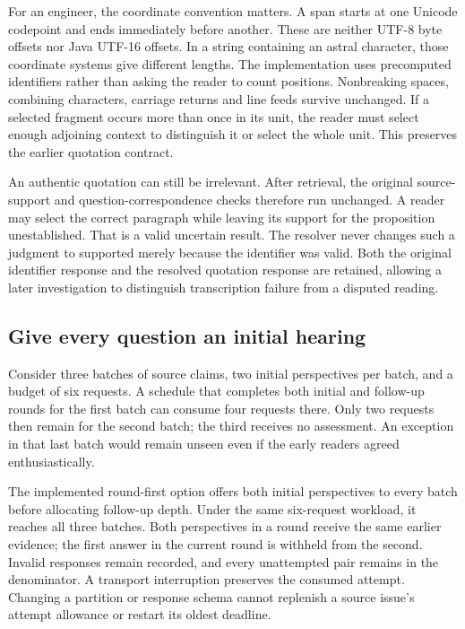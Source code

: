 \documentclass[12pt,a4paper,oneside,openany]{book}
\begin{document}
For an engineer, the coordinate convention matters. A span starts at one
Unicode codepoint and ends immediately before another. These are neither UTF-8
byte offsets nor Java UTF-16 offsets. In a string containing an astral character,
those coordinate systems give different lengths. The implementation uses
precomputed identifiers rather than asking the reader to count positions.
Nonbreaking spaces, combining characters, carriage returns and line feeds
survive unchanged. If a selected fragment occurs more than once in its unit,
the reader must select enough adjoining context to distinguish it or select the
whole unit. This preserves the earlier quotation contract.

An authentic quotation can still be irrelevant. After retrieval, the original
source-support and question-correspondence checks therefore run unchanged. A
reader may select the correct paragraph while leaving its support for the
proposition unestablished. That is a valid uncertain result. The resolver never
changes such a judgment to supported merely because the identifier was valid.
Both the original identifier response and the resolved quotation response are
retained, allowing a later investigation to distinguish transcription failure
from a disputed reading.

\subsection{Give every question an initial hearing}

Consider three batches of source claims, two initial perspectives per batch,
and a budget of six requests. A schedule that completes both initial and
follow-up rounds for the first batch can consume four requests there. Only two
requests then remain for the second batch; the third receives no assessment.
An exception in that last batch would remain unseen even if the early readers
agreed enthusiastically.

The implemented round-first option offers both initial perspectives to every
batch before allocating follow-up depth. Under the same six-request workload,
it reaches all three batches. Both perspectives in a round receive the same
earlier evidence; the first answer in the current round is withheld from the
second. Invalid responses remain recorded, and every unattempted pair remains
in the denominator. A transport interruption preserves the consumed attempt.
Changing a partition or response schema cannot replenish a source issue's
attempt allowance or restart its oldest deadline.
\end{document}

